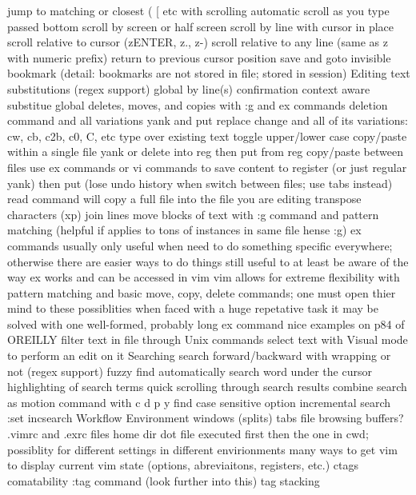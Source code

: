 \documentclass[12pt]{book}
\begin{document}
    jump to matching or closest ( { [ etc with %
  scrolling
    automatic scroll as you type passed bottom
    scroll by screen or half screen
    scroll by line with cursor in place
    scroll relative to cursor (zENTER, z., z-)
    scroll relative to any line (same as z with numeric prefix)
  return to previous cursor position
  save and goto invisible bookmark (detail: bookmarks are not stored in file; stored in session)
Editing text
  substitutions (regex support)
    global
    by line(s)
    confirmation
    context aware substitue
  global deletes, moves, and copies with :g and ex commands
  deletion command and all variations
  yank and put
  replace
    change and all of its variations: cw, cb, c2b, c0, C, etc 
    type over existing text
  toggle upper/lower case
  copy/paste within a single file
    yank or delete into reg then put from reg
  copy/paste between files
    use ex commands or vi commands to save content to register (or just regular yank) then put (lose undo history when switch between files; use tabs instead)
    read command will copy a full file into the file you are editing
  transpose characters (xp)
  join lines
  move blocks of text
    with :g command and pattern matching (helpful if applies to tons of instances in same file hense :g)
  ex commands
    usually only useful when need to do something specific everywhere; otherwise there are easier ways to do things
    still useful to at least be aware of the way ex works and can be accessed in vim
    vim allows for extreme flexibility with pattern matching and basic move, copy, delete commands; one must open thier mind to these possiblities when faced with a huge repetative task
    it may be solved with one well-formed, probably long ex command
    nice examples on p84 of OREILLY
  filter text in file through Unix commands
  select text with Visual mode to perform an edit on it
Searching
  search forward/backward with wrapping or not (regex support)
  fuzzy find
  automatically search word under the cursor
  highlighting of search terms
  quick scrolling through search results
  combine search as motion command with c d p y
  find
  case sensitive option
  incremental search :set incsearch
Workflow
  Environment
    windows (splits)
    tabs
    file browsing
  buffers?
  .vimrc and .exrc files
    home dir dot file executed first then the one in cwd; possiblity for different settings in different envirionments
  many ways to get vim to display current vim state (options, abreviaitons, registers, etc.)
  ctags comatability
    :tag command (look further into this)
    tag stacking
}
\end{document}
